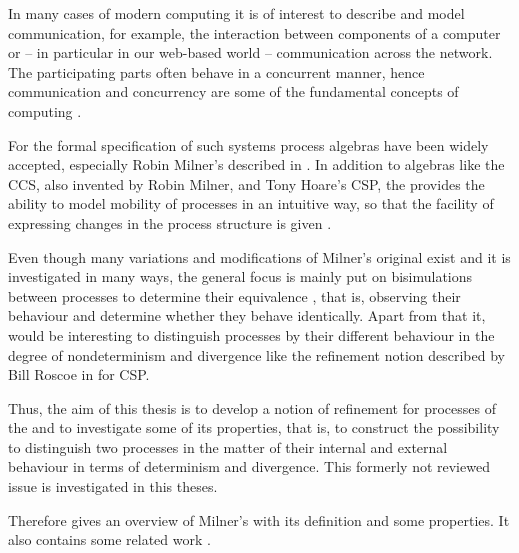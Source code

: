 \begin{old}[proposal]
In many cases of modern computing it is of interest to describe and model communication, for example, the interaction between components of a computer or -- in particular in our web-based world -- communication across the network. The participating parts often behave in a concurrent manner, hence communication and concurrency are some of the fundamental concepts of computing \cite{milner}.

For the formal specification of such systems process algebras have been widely accepted, especially Robin Milner's \picalc{} described in \cite{milner}. In addition to algebras like the \gls{CCS}, also invented by Robin Milner, and Tony Hoare's \gls{CSP}, the \picalc{} provides the ability to model mobility of processes in an intuitive way, so that the facility of expressing changes in the process structure is given \cite{canal}.

Even though many variations and modifications of Milner's original \picalc{} exist and it is investigated in many ways, the general focus is mainly put on bisimulations between processes to determine their equivalence \cite{pistore}, that is, observing their behaviour and determine whether they behave identically. Apart from that it, would be interesting to distinguish processes by their different behaviour in the degree of nondeterminism and divergence like the refinement notion described by Bill Roscoe in \cite{roscoe} for CSP. 

Thus, the aim of this thesis is to develop a notion of refinement for processes of the \picalc{} and to investigate some of its properties, that is, to construct the possibility to distinguish two \picalc{} processes in the matter of their internal and external behaviour in terms of determinism and divergence. This formerly not reviewed issue is investigated in this theses.

Therefore  gives an overview of Milner's \picalc{} with its definition and some properties. It also contains some related work .
\end{old}

